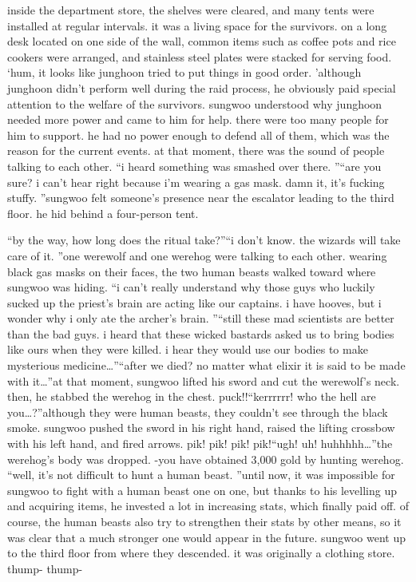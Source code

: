 inside the department store, the shelves were cleared, and many tents were installed at regular intervals.
 it was a living space for the survivors.
on a long desk located on one side of the wall, common items such as coffee pots and rice cookers were arranged, and stainless steel plates were stacked for serving food.
‘hum, it looks like junghoon tried to put things in good order.
’although junghoon didn’t perform well during the raid process, he obviously paid special attention to the welfare of the survivors.
sungwoo understood why junghoon needed more power and came to him for help.
 there were too many people for him to support.
 he had no power enough to defend all of them, which was the reason for the current events.
at that moment, there was the sound of people talking to each other.
“i heard something was smashed over there.
”“are you sure? i can’t hear right because i’m wearing a gas mask.
 damn it, it’s fucking stuffy.
”sungwoo felt someone’s presence near the escalator leading to the third floor.
he hid behind a four-person tent.


“by the way, how long does the ritual take?”“i don’t know.
 the wizards will take care of it.
”one werewolf and one werehog were talking to each other.
 wearing black gas masks on their faces, the two human beasts walked toward where sungwoo was hiding.
“i can’t really understand why those guys who luckily sucked up the priest’s brain are acting like our captains.
 i have hooves, but i wonder why i only ate the archer’s brain.
”“still these mad scientists are better than the bad guys.
 i heard that these wicked bastards asked us to bring bodies like ours when they were killed.
 i hear they would use our bodies to make mysterious medicine…”“after we died? no matter what elixir it is said to be made with it…”at that moment, sungwoo lifted his sword and cut the werewolf’s neck.
 then, he stabbed the werehog in the chest.
puck!!“kerrrrrr! who the hell are you…?”although they were human beasts, they couldn’t see through the black smoke.
sungwoo pushed the sword in his right hand, raised the lifting crossbow with his left hand, and fired arrows.
pik! pik! pik! pik!“ugh! uh! huhhhhh…”the werehog’s body was dropped.
-you have obtained 3,000 gold by hunting werehog.
“well, it’s not difficult to hunt a human beast.
”until now, it was impossible for sungwoo to fight with a human beast one on one, but thanks to his levelling up and acquiring items, he invested a lot in increasing stats, which finally paid off.
of course, the human beasts also try to strengthen their stats by other means, so it was clear that a much stronger one would appear in the future.
sungwoo went up to the third floor from where they descended.
 it was originally a clothing store.
thump- thump-

 